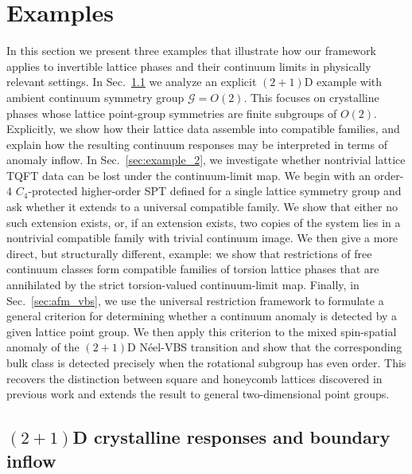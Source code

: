 \documentclass[aps,prx,reprint,superscriptaddress,twocolumn,amsmath,amssymb,amsfonts, nofootinbib]{revtex4-2}
\theoremstyle{apsstyle}
\begin{document}
\section{Examples}
\label{sec:examples} 


In this section we present three examples that illustrate how our framework applies to invertible lattice phases and their continuum limits in physically relevant settings. In Sec.~\ref{sec:example_1} we analyze an explicit $(2{+}1)$D example with ambient continuum symmetry group $\mathcal G=O(2)$. This focuses on crystalline phases whose lattice point-group symmetries are finite subgroups of $O(2).$ Explicitly, we show how their lattice data assemble into compatible families, and explain how the resulting continuum responses may be interpreted in terms of anomaly inflow. 
In Sec.~\ref{sec:example_2}, we investigate whether nontrivial lattice TQFT data can be lost under the continuum-limit map. We begin with an order-$4$ $C_4$-protected higher-order SPT defined for a single lattice symmetry group and ask whether it extends to a universal compatible family. We show that either no such extension exists, or, if an extension exists, two copies of the system lies in a nontrivial compatible family with trivial continuum image. We then give a more direct, but structurally different, example: we show that restrictions of free continuum classes form compatible families of torsion lattice phases that are annihilated by the strict torsion-valued continuum-limit map. 
Finally, in Sec.~\ref{sec:afm_vbs}, we use the universal restriction framework to formulate a general criterion for determining whether a continuum anomaly is detected by a given lattice point group. We then apply this criterion to the mixed spin-spatial anomaly of the $(2{+}1)$D N\'eel-VBS transition and show that the corresponding bulk class is detected precisely when the rotational subgroup has even order. This recovers the distinction between square and honeycomb lattices discovered in previous work and extends the result to general two-dimensional point groups.



\subsection{$(2{+}1)$D crystalline responses and boundary inflow}
\label{sec:example_1}
\end{document}
